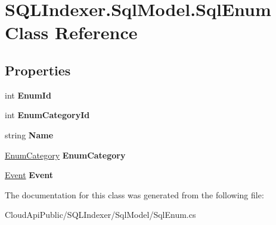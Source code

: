 \hypertarget{class_s_q_l_indexer_1_1_sql_model_1_1_sql_enum}{\section{S\-Q\-L\-Indexer.\-Sql\-Model.\-Sql\-Enum Class Reference}
\label{class_s_q_l_indexer_1_1_sql_model_1_1_sql_enum}
}
\subsection*{Properties}
\begin{DoxyCompactItemize}
\item 
\hypertarget{class_s_q_l_indexer_1_1_sql_model_1_1_sql_enum_a52082a25d62ffe7193af0ddf5327a998}{int {\bfseries Enum\-Id}}\label{class_s_q_l_indexer_1_1_sql_model_1_1_sql_enum_a52082a25d62ffe7193af0ddf5327a998}

\item 
\hypertarget{class_s_q_l_indexer_1_1_sql_model_1_1_sql_enum_a6c24001b40e51e187480b9ecb8b2ee3a}{int {\bfseries Enum\-Category\-Id}}\label{class_s_q_l_indexer_1_1_sql_model_1_1_sql_enum_a6c24001b40e51e187480b9ecb8b2ee3a}

\item 
\hypertarget{class_s_q_l_indexer_1_1_sql_model_1_1_sql_enum_ad4ad6790ba1fe8987e43b3b6d70cfb65}{string {\bfseries Name}}\label{class_s_q_l_indexer_1_1_sql_model_1_1_sql_enum_ad4ad6790ba1fe8987e43b3b6d70cfb65}

\item 
\hypertarget{class_s_q_l_indexer_1_1_sql_model_1_1_sql_enum_ae25b1fd00256aa0f1453c9df35e0bf51}{\hyperlink{class_s_q_l_indexer_1_1_sql_model_1_1_enum_category}{Enum\-Category} {\bfseries Enum\-Category}}\label{class_s_q_l_indexer_1_1_sql_model_1_1_sql_enum_ae25b1fd00256aa0f1453c9df35e0bf51}

\item 
\hypertarget{class_s_q_l_indexer_1_1_sql_model_1_1_sql_enum_a1f878e6b761eac4e320623f44546ef3b}{\hyperlink{class_s_q_l_indexer_1_1_sql_model_1_1_event}{Event} {\bfseries Event}}\label{class_s_q_l_indexer_1_1_sql_model_1_1_sql_enum_a1f878e6b761eac4e320623f44546ef3b}

\end{DoxyCompactItemize}


The documentation for this class was generated from the following file\-:\begin{DoxyCompactItemize}
\item 
Cloud\-Api\-Public/\-S\-Q\-L\-Indexer/\-Sql\-Model/Sql\-Enum.\-cs\end{DoxyCompactItemize}

